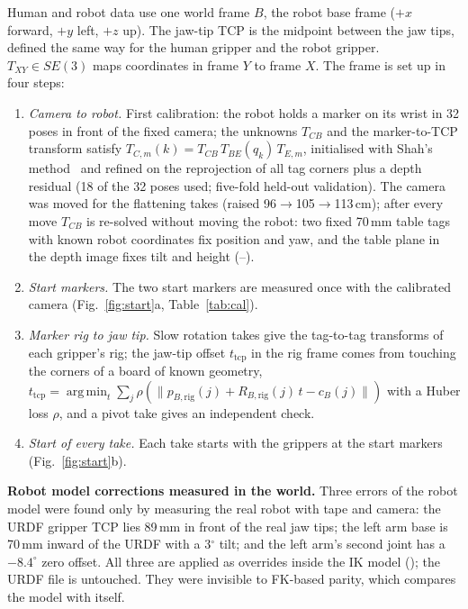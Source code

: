 \documentclass[conference,10pt]{IEEEtran}
\newcommand{\mm}{\,mm\xspace}
\DeclareMathOperator*{\argmin}{arg\,min}
\begin{document}
Human and robot data use one world frame $B$, the robot base frame ($+x$ forward, $+y$ left, $+z$ up). The jaw-tip TCP
is the midpoint between the jaw tips, defined the same way for the human gripper and the robot gripper. $T_{XY}\in SE(3)$
maps coordinates in frame $Y$ to frame $X$. The frame is set up in four steps:
\begin{enumerate}
\item \emph{Camera to robot.} First calibration: the robot holds a marker on its wrist in 32 poses in front of the fixed
  camera; the unknowns $T_{CB}$ and the marker-to-TCP transform satisfy $T_{C,m}(k)=T_{CB}\,T_{BE}(q_k)\,T_{E,m}$,
  initialised with Shah's method~\cite{shah2013robotworld} and refined on the reprojection of all tag corners plus a
  depth residual (18 of the 32 poses used; five-fold held-out validation). The camera was moved for the flattening
  takes (raised 96$\to$105$\to$113\,cm); after every move $T_{CB}$ is re-solved without moving the robot: two fixed
  70\mm table tags with known robot coordinates fix position and yaw, and the table plane in the depth image fixes tilt
  and height (--).
\item \emph{Start markers.} The two start markers are measured once with the calibrated camera
  (Fig.~\ref{fig:start}a, Table~\ref{tab:cal}).
\item \emph{Marker rig to jaw tip.} Slow rotation takes give the tag-to-tag transforms of each gripper's rig; the jaw-tip
  offset $t_\mathrm{tcp}$ in the rig frame comes from touching the corners of a board of known geometry,
  $t_\mathrm{tcp}=\argmin_t\sum_j\rho(\lVert p_{B,\mathrm{rig}}(j)+R_{B,\mathrm{rig}}(j)\,t-c_B(j)\rVert)$ with a Huber
  loss $\rho$, and a pivot take gives an independent check.
\item \emph{Start of every take.} Each take starts with the grippers at the start markers (Fig.~\ref{fig:start}b).
\end{enumerate}

\textbf{Robot model corrections measured in the world.} Three errors of the robot model were found only by measuring
the real robot with tape and camera: the URDF gripper TCP lies 89\mm in front of the real jaw tips; the left arm base is
70\mm inward of the URDF with a 3$^\circ$ tilt; and the left arm's second joint has a $-8.4^\circ$ zero offset. All three
are applied as overrides inside the IK model (); the URDF file is untouched. They were invisible to
FK-based parity, which compares the model with itself.
\end{document}
